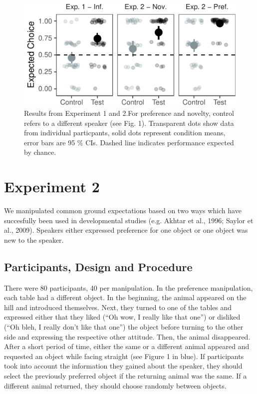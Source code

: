 \documentclass[10pt, letterpaper]{article}
\newenvironment{CodeChunk}{}{}
\begin{document}
\begin{CodeChunk}
\begin{figure}[H]

{\centering \includegraphics{figs/plotexp12-1} 

}

\caption[Results from Experiment 1 and 2.For preference and novelty, control refers to a different speaker (see Fig]{Results from Experiment 1 and 2.For preference and novelty, control refers to a different speaker (see Fig. 1). Transparent dots show data from individual particpants, solid dots represent condition means, error bars are 95 \% CIs. Dashed line indicates performance expected by chance.}\label{fig:plotexp12}
\end{figure}
\end{CodeChunk}

\section{Experiment 2}\label{experiment-2}

We manipulated common ground expectations based on two ways which have
succesfully been used in developmental studies (e.g. Akhtar et al.,
1996; Saylor et al., 2009). Speakers either expressed preference for one
object or one object was new to the speaker.

\subsection{Participants, Design and
Procedure}\label{participants-design-and-procedure-1}

There were 80 participants, 40 per manipulation. In the preference
manipulation, each table had a different object. In the beginning, the
animal appeared on the hill and introduced themselves. Next, they turned
to one of the tables and expressed either that they liked (``Oh wow, I
really like that one'') or disliked (``Oh bleh, I really don't like that
one'') the object before turning to the other side and expressing the
respective other attitude. Then, the animal disappeared. After a short
period of time, either the same or a different animal appeared and
requested an object while facing straight (see Figure 1 in blue). If
participants took into account the information they gained about the
speaker, they should select the previously preferred object if the
returning animal was the same. If a different animal returned, they
should choose randomly between objects.
\end{document}

